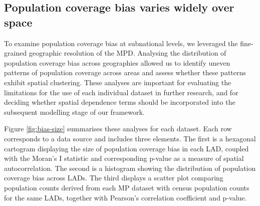 \documentclass[]{rsos}%
\begin{document}
\subsection{Population coverage bias varies widely over space}\label{population-coverage-bias-varies-widely-over-space}

To examine population coverage bias at subnational levels, we leveraged the
fine-grained geographic resolution of the MPD. Analysing
the distribution of population coverage bias across geographies allowed us to
identify uneven patterns of population coverage across areas and assess
whether these patterns exhibit spatial clustering. These analyses
are important for evaluating the limitations for the use of each individual dataset in
further research, and for deciding whether spatial dependence terms
should be incorporated into the subsequent modelling stage of our framework.

Figure \ref{fig:bias-size} summarises these analyses for each dataset.
Each row corresponds to a data source and includes three elements. The first is a
hexagonal cartogram displaying the size of population coverage bias in each LAD,
coupled with the Moran's I statistic and corresponding p-value as a measure
of spatial autocorrelation. The second is a histogram showing the distribution of population coverage bias across LADs. The third displays a scatter plot comparing population
counts derived from each MP dataset with census population counts for
the same LADs, together with Pearson's correlation coefficient and
p-value.
\end{document}
